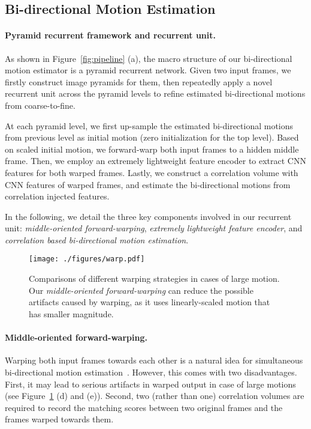 \documentclass[10pt,twocolumn,letterpaper]{article}
\begin{document}
\subsection{Bi-directional Motion Estimation}\label{subsec:our-flow}


\paragraph{Pyramid recurrent framework and recurrent unit.} As shown in
Figure~\ref{fig:pipeline} (a), the macro structure of our bi-directional motion
estimator is a pyramid recurrent network. Given two input frames, we firstly
construct image pyramids for them, then repeatedly apply a novel recurrent unit
across the pyramid levels to refine estimated bi-directional motions from
coarse-to-fine.


At each pyramid level, we first up-sample the estimated bi-directional motions
from previous level as initial motion (zero initialization for the top level).
Based on scaled initial motion, we forward-warp both input frames to a hidden
middle frame. Then, we employ an extremely lightweight feature encoder to
extract CNN features for both warped frames.  Lastly, we construct a correlation
volume with CNN features of warped frames, and estimate the bi-directional
motions from correlation injected features.


In the following, we detail the three key components involved in our
recurrent unit: \textit{middle-oriented forward-warping},
\textit{extremely lightweight feature encoder}, and \textit{correlation based
bi-directional motion estimation}.



\begin{figure}[tb]
\centering
\texttt{[image: ./figures/warp.pdf]}
\caption{Comparisons of different warping strategies in cases of large motion.
Our \textit{middle-oriented forward-warping} can reduce the possible artifacts
caused by warping, as it uses linearly-scaled motion that has smaller
magnitude.}
\label{fig:warp}
\end{figure}


\paragraph{Middle-oriented forward-warping.} Warping both input frames towards
each other is a natural idea for simultaneous bi-directional motion
estimation~\cite{sim2021xvfi}. However, this comes with two disadvantages.
First, it may lead to serious artifacts in warped output in case of large
motions (see Figure~\ref{fig:warp} (d) and (e)). Second, two (rather than one)
correlation volumes are required to record the matching scores between two
original frames and the frames warped towards them.
\end{document}
